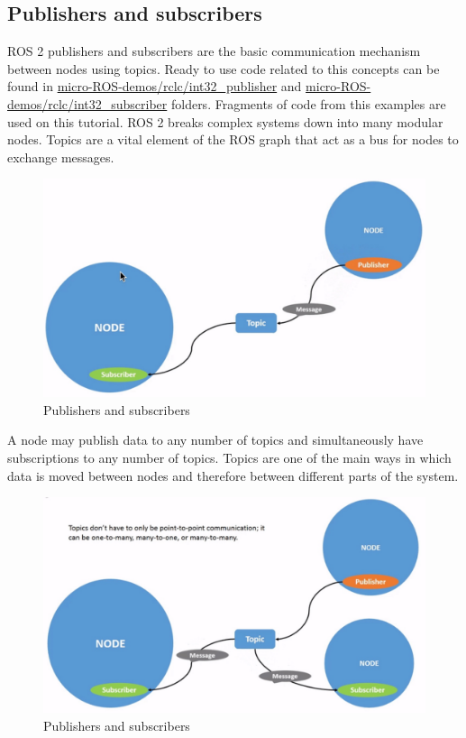 \subsection{Publishers and subscribers}
ROS 2 publishers and subscribers are the basic communication mechanism between nodes using topics. Ready to use code related to this concepts can be found in \href{https://github.com/micro-ROS/micro-ROS-demos/blob/foxy/rclc/int32_publisher/main.c}{micro-ROS-demos/rclc/int32\_publisher} and \href{https://github.com/micro-ROS/micro-ROS-demos/blob/foxy/rclc/int32_subscriber/main.c}{micro-ROS-demos/rclc/int32\_subscriber} folders. Fragments of code from this examples are used on this tutorial. ROS 2 breaks complex systems down into many modular nodes. Topics are a vital element of the ROS graph that act as a bus for nodes to exchange messages.
\begin{figure}[htb!]
    \centering
    \includegraphics[width=0.55\linewidth]{Img/topic.jpg}
    \caption{Publishers and subscribers}\label{f:topic}
    \vspace{-0.1in}
\end{figure}

A node may publish data to any number of topics and simultaneously have subscriptions to any number of topics. Topics are one of the main ways in which data is moved between nodes and therefore between different parts of the system.
\begin{figure}[htb!]
    \centering
    \includegraphics[width=0.55\linewidth]{Img/topic2.jpg}
    \caption{Publishers and subscribers}\label{f:topic2}
    \vspace{-0.1in}
\end{figure}

